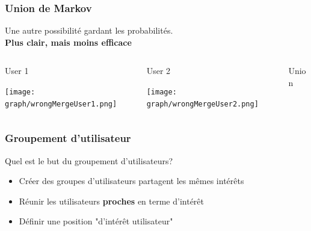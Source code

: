 \documentclass{beamer}
\begin{document}
        \begin{frame}
        \frametitle{Union de Markov}
        Une autre possibilité gardant les probabilités.\\
        \pause[5]\textbf{Plus clair, mais moins efficace}
        \pause[2]
        \begin{columns}[t]
        \begin{column}{3cm}
        \begin{exampleblock}{User 1}
        \begin{center}
        \texttt{[image: graph/wrongMergeUser1.png]}
        \end{center}
        \end{exampleblock}
        \end{column}
        \begin{column}{3cm}
        \begin{exampleblock}{User 2}
        \begin{center}
        \texttt{[image: graph/wrongMergeUser2.png]}
        \end{center}
        \end{exampleblock}
        \end{column}
        \pause[3]
        \begin{column}{3cm}
        \begin{exampleblock}{Union}
        \begin{center}
        \pause[4]
        \end{center}
        \end{exampleblock}
        \end{column}
        \end{columns}
        \end{frame}
        \begin{frame}
        \frametitle{Groupement d'utilisateur}
        Quel est le but du groupement d'utilisateurs?
        \pause
        \begin{itemize}
        \item Créer des groupes d'utilisateurs partagent les mêmes intérêts
        \pause
        \item Réunir les utilisateurs \textbf{proches} en terme d'intérêt
        \pause
        \item Définir une position "d'intérêt utilisateur"
        \end{itemize}
        \end{frame}
\end{document}
